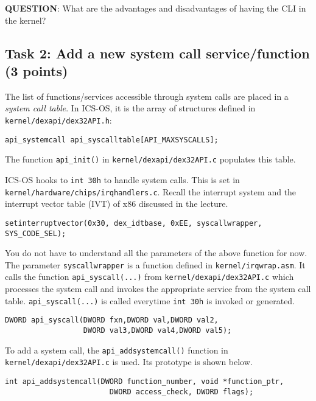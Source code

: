 \documentclass[a4paper, 11pt,oneside]{article}
\begin{document}
\textbf{QUESTION}: What are the advantages and disadvantages of having the CLI 
in the kernel?

\subsection*{Task 2: Add a new system call service/function (3 points)}
The list of functions/services accessible through system calls are placed in a
\textit{system call table}. In ICS-OS, it is the array of structures 
defined in \texttt{kernel/dexapi/dex32API.h}: 

\begin{verbatim}
api_systemcall api_syscalltable[API_MAXSYSCALLS];
\end{verbatim}

The function \texttt{api\_init()} in \texttt{kernel/dexapi/dex32API.c}
populates this table. 

ICS-OS hooks to \texttt{int 30h} to handle system calls. This is set in
\texttt{kernel/hardware/chips/irqhandlers.c}. Recall the interrupt system 
and the interrupt vector table (IVT) of x86 discussed in the lecture.

\begin{verbatim}
setinterruptvector(0x30, dex_idtbase, 0xEE, syscallwrapper, SYS_CODE_SEL); 
\end{verbatim}

You do not have to understand all the parameters of the above function for now. 
The parameter \texttt{syscallwrapper} is a function defined in 
\texttt{kernel/irqwrap.asm}. It calls the function \texttt{api\_syscall(...)} 
from \texttt{kernel/dexapi/dex32API.c} which processes the system call and 
invokes the appropriate service from the system call table. 
\texttt{api\_syscall(...)} is called everytime \texttt{int 30h} is invoked or  
generated.

\begin{verbatim}
DWORD api_syscall(DWORD fxn,DWORD val,DWORD val2,
                  DWORD val3,DWORD val4,DWORD val5);
\end{verbatim}


To add a system call, the \texttt{api\_addsystemcall()} function in 
\texttt{kernel/dexapi/dex32API.c} is used. Its prototype is shown below.
\begin{verbatim}
int api_addsystemcall(DWORD function_number, void *function_ptr,
                        DWORD access_check, DWORD flags);
\end{verbatim}
\end{document}
